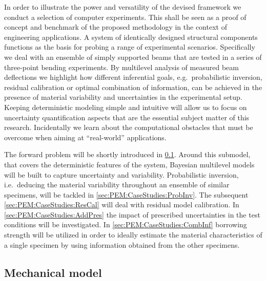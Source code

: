 In order to illustrate the power and versatility of the devised framework we conduct a selection of computer experiments.
This shall be seen as a proof of concept and benchmark of the proposed methodology in the context of engineering applications.
A system of identically designed structural components functions as the basis for probing a range of experimental scenarios.
Specifically we deal with an ensemble of simply supported beams that are tested in a series of three-point bending experiments.
By multilevel analysis of measured beam deflections we highlight how different inferential goals, e.g.\ probabilistic inversion, residual calibration or optimal combination of information,
can be achieved in the presence of material variability and uncertainties in the experimental setup.
Keeping deterministic modeling simple and intuitive will allow us to focus on uncertainty quantification aspects that are the essential subject matter of this research.
Incidentally we learn about the computational obstacles that must be overcome when aiming at ``real-world'' applications.
\par %
The forward problem will be shortly introduced in \cref{sec:PEM:CaseStudies:Beams}.
Around this submodel, that covers the deterministic features of the system, Bayesian multilevel models will be built to capture uncertainty and variability.
Probabilistic inversion, i.e.\ deducing the material variability throughout an ensemble of similar specimens, will be tackled in \cref{sec:PEM:CaseStudies:ProbInv}.
The subsequent \cref{sec:PEM:CaseStudies:ResCal} will deal with residual model calibration.
In \cref{sec:PEM:CaseStudies:AddPres} the impact of prescribed uncertainties in the test conditions will be investigated.
In \cref{sec:PEM:CaseStudies:CombInf} borrowing strength will be utilized in order to ideally estimate the material characteristics of a single specimen by using information obtained from the other specimens.

\subsection{Mechanical model} \label{sec:PEM:CaseStudies:Beams}


